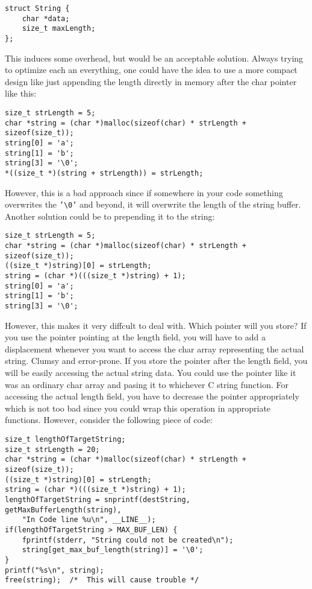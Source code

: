 \begin{lstlisting}
struct String {
    char *data;
    size_t maxLength;
};
\end{lstlisting}

This induces some overhead, but would be an acceptable solution. 
Always trying to optimize each an everything, one could have the idea to
use a more compact design like just appending the length directly in memory
after the char pointer like this:

\begin{lstlisting}
size_t strLength = 5;
char *string = (char *)malloc(sizeof(char) * strLength + sizeof(size_t));
string[0] = 'a';
string[1] = 'b';
string[3] = '\0';
*((size_t *)(string + strLength)) = strLength;
\end{lstlisting}

However, this is a bad approach since if somewhere in your code something
overwrites the \texttt{'\textbackslash0'} and beyond, it will overwrite the 
length of the string buffer.
Another solution could be to prepending it to the string:
 
\begin{lstlisting}
size_t strLength = 5;
char *string = (char *)malloc(sizeof(char) * strLength + sizeof(size_t));
((size_t *)string)[0] = strLength;
string = (char *)(((size_t *)string) + 1);
string[0] = 'a';
string[1] = 'b';
string[3] = '\0';
\end{lstlisting}

However, this makes it very diffcult to deal with. Which pointer will you store?
If you use the pointer pointing at the length field, you will have to add 
a displacement whenever you want to access the char array representing the
actual string. Clumsy and error-prone.
If you store the pointer after the length field, you will be easily accessing 
the actual string data. You could use the pointer like it was an ordinary 
char array and pasing it to whichever C string function. 
For accessing the actual length field, you have to decrease the pointer 
appropriately which is not too bad since you could wrap this operation in 
appropriate functions.
However, consider the following piece of code:

\begin{lstlisting}
size_t lengthOfTargetString;
size_t strLength = 20;
char *string = (char *)malloc(sizeof(char) * strLength + sizeof(size_t));
((size_t *)string)[0] = strLength;
string = (char *)(((size_t *)string) + 1);
lengthOfTargetString = snprintf(destString, getMaxBufferLength(string),
    "In Code line %u\n", __LINE__);
if(lengthOfTargetString > MAX_BUF_LEN) {
    fprintf(stderr, "String could not be created\n");
    string[get_max_buf_length(string)] = '\0';
}
printf("%s\n", string);
free(string);  /*  This will cause trouble */
\end{lstlisting}

